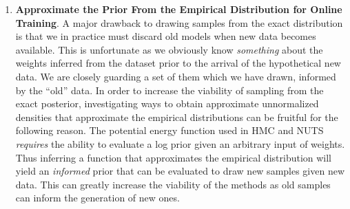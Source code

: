 \begin{enumerate}
    \item \textbf{Approximate the Prior From the Empirical Distribution for Online Training}. A major drawback to drawing samples from the exact distribution is that we in practice must discard old models when new data becomes available. This is unfortunate as we obviously know \textit{something} about the weights inferred from the dataset prior to the arrival of the hypothetical new data. We are closely guarding a set of them which we have drawn, informed by the ``old'' data. In order to increase the viability of sampling from the exact posterior, investigating ways to obtain approximate unnormalized densities that approximate the empirical distributions can be fruitful for the following reason. The potential energy function used in HMC and NUTS \textit{requires} the ability to evaluate a log prior given an arbitrary input of weights. Thus inferring a function that approximates the empirical distribution will yield an \textit{informed} prior that can be evaluated to draw new samples given new data. This can greatly increase the viability of the methods as old samples can inform the generation of new ones. 
\end{enumerate}